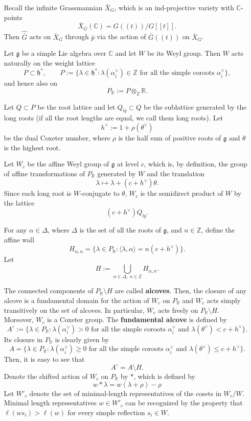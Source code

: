\documentclass[12pt]{article}
\begin{document}
Recall the infinite Grassmannian $\bar X_G$, which is an ind-projective variety with $\mathbb C$-points
\[
\bar X_G(\mathbb C)=G((t))/G[[t]].
\]
Then $\widehat{\bar G}$ acts on $\bar X_G$ through $\bar p$ via the action of $\bar G((t))$ on $\bar X_G$.

Let $\mathfrak g$ be a simple Lie algebra over $\mathbb C$ and let $W$ be its Weyl group. Then $W$ acts naturally on the weight lattice
\[
P\subset \mathfrak h^*,
\qquad
P:=\{\lambda\in \mathfrak h^*:\lambda(\alpha_i^\vee)\in \mathbb Z
\text{ for all the simple coroots } \alpha_i^\vee\},
\]
and hence also on
\[
P_{\mathbb R}:=P\otimes_{\mathbb Z}\mathbb R.
\]

Let $Q\subset P$ be the root lattice and let $Q_{lg}\subset Q$ be the sublattice generated by the long roots (if all the root lengths are equal, we call them long roots). Let
\[
h^\vee := 1+\rho(\theta^\vee)
\]
be the dual Coxeter number, where $\rho$ is the half sum of positive roots of $\mathfrak g$ and $\theta$ is the highest root.


Let $W_c$ be the affine Weyl group of $\mathfrak g$ at level $c$, which is, by definition, the group of affine transformations of $P_{\mathbb R}$ generated by $W$ and the translation
\[
\lambda \longmapsto \lambda + (c+h^\vee)\theta.
\]
Since each long root is $W$-conjugate to $\theta$, $W_c$ is the semidirect product of $W$ by the lattice
\[
(c+h^\vee)Q_{lg}.
\]

For any $\alpha\in \Delta$, where $\Delta$ is the set of all the roots of $\mathfrak g$, and $n\in \mathbb Z$, define the affine wall
\[
H_{\alpha,n}
=
\{\lambda\in P_{\mathbb R}:\langle \lambda,\alpha\rangle = n(c+h^\vee)\}.
\]
Let
\[
H:=\bigcup_{\alpha\in \Delta,\; n\in \mathbb Z} H_{\alpha,n}.
\]

The connected components of $P_{\mathbb R}\setminus H$ are called \textbf{alcoves}. Then, the closure of any alcove is a fundamental domain for the action of $W_c$ on $P_{\mathbb R}$ and $W_c$ acts simply transitively on the set of alcoves. In particular, $W_c$ acts freely on $P_{\mathbb R}\setminus H$. Moreover, $W_c$ is a Coxeter group. The \textbf{fundamental alcove} is defined by
\[
A^\circ
:=
\{\lambda\in P_{\mathbb R}:\lambda(\alpha_i^\vee)>0
\text{ for all the simple coroots } \alpha_i^\vee
\text{ and } \lambda(\theta^\vee)<c+h^\vee\}.
\]
Its closure in $P_{\mathbb R}$ is clearly given by
\[
A
=
\{\lambda\in P_{\mathbb R}:\lambda(\alpha_i^\vee)\ge 0
\text{ for all the simple coroots } \alpha_i^\vee
\text{ and } \lambda(\theta^\vee)\le c+h^\vee\}.
\]
Then, it is easy to see that
\begin{equation}
A^\circ = A\setminus H.
\end{equation}
Denote the shifted action of $W_c$ on $P_{\mathbb R}$ by $*$, which is defined by
\[w*\lambda = w(\lambda+\rho)-\rho\]
Let $W'_c$ denote the set of minimal-length representatives of the cosets in $W_c/W$. Minimal length representatives $w\in W'_c$ can be recognized by the property that
$\ell(ws_i)>\ell(w)$ for every simple reflection $s_i\in W$.
\end{document}
